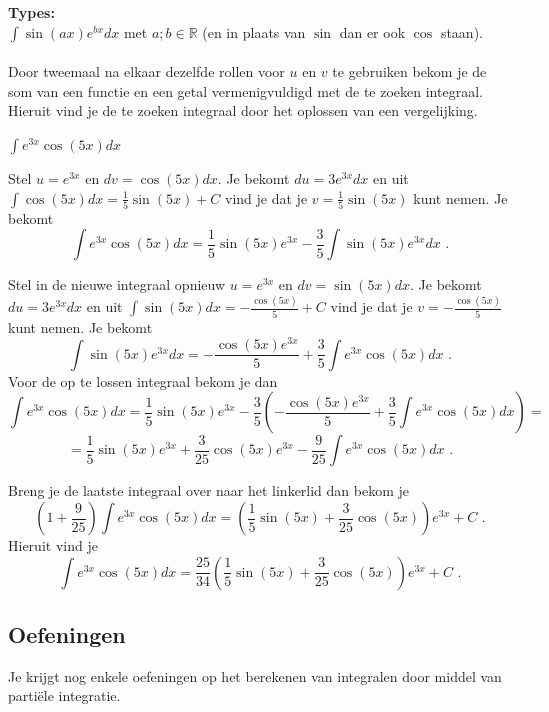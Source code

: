 \begin{ftrekenregel}
	\textbf{Types:} \\

$\int \sin (ax)e^{bx}dx$ met $a; b \in \mathbb{R}$ (en in plaats van $\sin$ dan er ook $\cos$ staan).
\\
\\
Door tweemaal na elkaar dezelfde rollen voor $u$ en $v$ te gebruiken bekom je de som van een functie en een getal vermenigvuldigd met de te zoeken integraal.
Hieruit vind je de te zoeken integraal door het oplossen van een vergelijking.
\end{ftrekenregel}

\begin{voorbeeld}
	$\int e^{3x}\cos (5x)dx$

Stel $u=e^{3x}$ en $dv=\cos (5x)dx$.
Je bekomt $du=3e^{3x}dx$ en uit $\int \cos (5x)dx=\frac{1}{5} \sin (5x)+C$ vind je dat je $v=\frac{1}{5} \sin (5x)$ kunt nemen.
Je bekomt
\[
\int e^{3x}\cos (5x)dx=\frac{1}{5}\sin (5x)e^{3x}-\frac{3}{5}\int \sin (5x)e^{3x}dx \text { .}
\]

Stel in de nieuwe integraal opnieuw $u=e^{3x}$ en $dv=\sin (5x)dx$.
Je bekomt $du=3e^{3x}dx$ en uit $\int \sin (5x)dx=-\frac {\cos (5x)}{5}+C$ vind je dat je $v=-\frac {\cos (5x)}{5}$ kunt nemen.
Je bekomt
\[
\int \sin (5x)e^{3x}dx=-\frac {\cos (5x)e^{3x}}{5}+\frac{3}{5}\int e^{3x}\cos (5x)dx \text { .}
\]
Voor de op te lossen integraal bekom je dan
\[
\int e^{3x}\cos (5x)dx=\frac{1}{5}\sin (5x)e^{3x}-\frac{3}{5} \left(  -\frac {\cos (5x)e^{3x}}{5}+\frac{3}{5}\int e^{3x}\cos (5x)dx  \right)=
\]
\[
=\frac{1}{5}\sin (5x)e^{3x}+\frac{3}{25} \cos (5x)e^{3x}-\frac{9}{25}\int e^{3x}\cos (5x)dx \text { .}
\]

Breng je de laatste integraal over naar het linkerlid dan bekom je
\[
\left( 1+\frac{9}{25}  \right) \int e^{3x}\cos (5x)dx = \left(  \frac{1}{5}\sin (5x)+\frac{3}{25} \cos (5x)  \right)e^{3x}+C \text { .}
\]
Hieruit vind je
\[
\int e^{3x}\cos (5x)dx=\frac{25}{34} \left( \frac{1}{5}\sin (5x)+\frac{3}{25} \cos (5x)   \right)e^{3x}+C \text { .}
\]

\end{voorbeeld}

\subsection{Oefeningen}

Je krijgt nog enkele oefeningen op het berekenen van integralen door middel van parti\"ele integratie.

